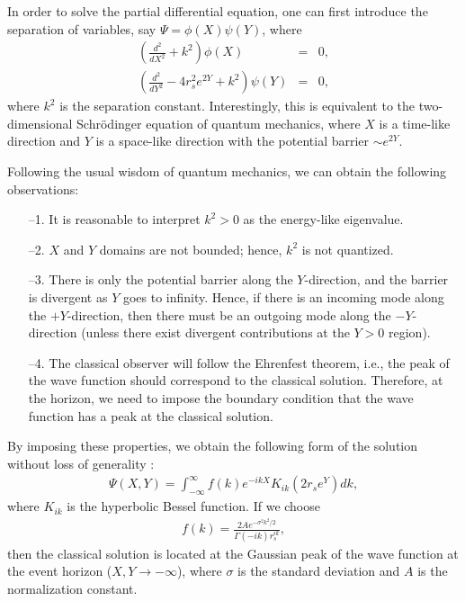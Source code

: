 \documentclass{andromedaone}
\begin{document}
In order to solve the partial differential equation, one can first introduce the separation of variables, say $\Psi = \phi(X) \psi(Y)$, where
\begin{eqnarray}
\left(\frac{d^{2}}{dX^{2}} + k^{2}\right) \phi(X) &=& 0, \\
\left(\frac{d^{2}}{dY^{2}} - 4 r_{s}^{2} e^{2Y} + k^{2}\right) \psi(Y) &=& 0,
\end{eqnarray}
where $k^{2}$ is the separation constant. Interestingly, this is equivalent to the two-dimensional Schr\"odinger equation of quantum mechanics, where $X$ is a time-like direction and $Y$ is a space-like direction with the potential barrier $\sim e^{2Y}$.

Following the usual wisdom of quantum mechanics, we can obtain the following observations:
\begin{itemize}
\item[--1.] It is reasonable to interpret $k^{2} > 0$ as the energy-like eigenvalue.
\item[--2.] $X$ and $Y$ domains are not bounded; hence, $k^{2}$ is not quantized.
\item[--3.] There is only the potential barrier along the $Y$-direction, and the barrier is divergent as $Y$ goes to infinity. Hence, if there is an incoming mode along the $+Y$-direction, then there must be an outgoing mode along the $-Y$-direction (unless there exist divergent contributions at the $Y > 0$ region).
\item[--4.] The classical observer will follow the Ehrenfest theorem, i.e., the peak of the wave function should correspond to the classical solution. Therefore, at the horizon, we need to impose the boundary condition that the wave function has a peak at the classical solution.
\end{itemize}
By imposing these properties, we obtain the following form of the solution without loss of generality \cite{Bouhmadi-Lopez:2019kkt}:
\begin{eqnarray}
\Psi(X,Y) = \int_{-\infty}^{\infty} f(k) e^{-ikX} K_{ik}\left(2r_{s} e^{Y}\right) dk,
\end{eqnarray}
where $K_{ik}$ is the hyperbolic Bessel function. If we choose
\begin{eqnarray}
f(k) = \frac{2A e^{-\sigma^{2}k^{2}/2}}{\Gamma(-ik)r_{s}^{ik}},
\end{eqnarray}
then the classical solution is located at the Gaussian peak of the wave function at the event horizon ($X, Y \rightarrow - \infty$), where $\sigma$ is the standard deviation and $A$ is the normalization constant.
\end{document}
